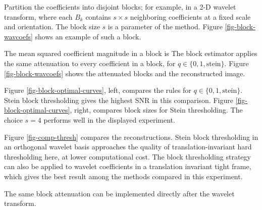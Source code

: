 Partition the coefficients into disjoint blocks; for example, in a 2-D wavelet transform,
where each $B_k$ contains $s\times s$ neighboring coefficients at a fixed scale and orientation. The block size $s$ is a parameter of the method.
Figure \ref{fig-block-wavcoefs} shows an example of such a block.

The mean squared coefficient magnitude in a block is
The block estimator
applies the same attenuation to every coefficient in a block,
for $q \in \{0,1,\text{stein}\}$.
Figure \ref{fig-block-wavcoefs} shows the attenuated blocks and the reconstructed image.


Figure \ref{fig-block-optimal-curves}, left, compares the rules for $q \in \{0,1,\text{stein}\}$. Stein block thresholding gives the highest SNR in this comparison.
Figure \ref{fig-block-optimal-curves}, right, compares block sizes for Stein thresholding. The choice $s=4$ performs well in the displayed experiment.


Figure \ref{fig-comp-thresh} compares the reconstructions. Stein block thresholding in an orthogonal wavelet basis approaches the quality of translation-invariant hard thresholding here, at lower computational cost.
The block thresholding strategy can also be applied to wavelet coefficients in a translation invariant tight frame, which gives the best result among the methods compared in this experiment.

The same block attenuation can be implemented directly after the wavelet transform.


